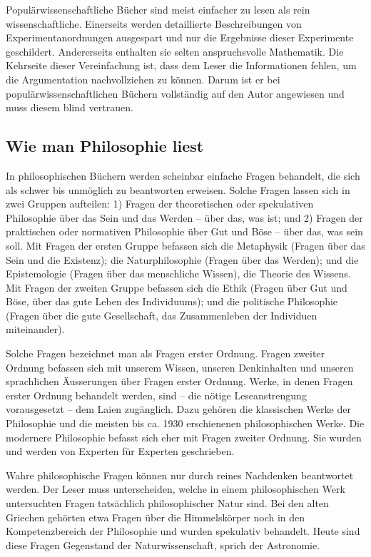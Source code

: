 \documentclass[a4paper,11pt]{scrartcl}
\begin{document}
Populärwissenschaftliche Bücher sind meist einfacher zu lesen als rein wissenschaftliche. Einerseits werden detaillierte Beschreibungen von Experimentanordnungen ausgespart und nur die Ergebnisse dieser Experimente geschildert. Andererseits enthalten sie selten anspruchsvolle Mathematik. Die Kehrseite dieser Vereinfachung ist, dass dem Leser die Informationen fehlen, um die Argumentation nachvollziehen zu können. Darum ist er bei populärwissenschaftlichen Büchern vollständig auf den Autor angewiesen und muss diesem blind vertrauen.

\subsection{Wie man Philosophie liest}

In philosophischen Büchern werden scheinbar einfache Fragen behandelt, die sich als schwer bis unmöglich zu beantworten erweisen. Solche Fragen lassen sich in zwei Gruppen aufteilen: 1) Fragen der theoretischen oder spekulativen Philosophie über das Sein und das Werden – über das, was ist; und 2) Fragen der praktischen oder normativen Philosophie über Gut und Böse – über das, was sein soll. Mit Fragen der ersten Gruppe befassen sich die Metaphysik (Fragen über das Sein und die Existenz); die Naturphilosophie (Fragen über das Werden); und die Epistemologie (Fragen über das menschliche Wissen), die Theorie des Wissens. Mit Fragen der zweiten Gruppe befassen sich die Ethik (Fragen über Gut und Böse, über das gute Leben des Individuums); und die politische Philosophie (Fragen über die gute Gesellschaft, das Zusammenleben der Individuen miteinander).

Solche Fragen bezeichnet man als Fragen erster Ordnung. Fragen zweiter Ordnung befassen sich mit unserem Wissen, unseren Denkinhalten und unseren sprachlichen Äusserungen über Fragen erster Ordnung. Werke, in denen Fragen erster Ordnung behandelt werden, sind – die nötige Leseanstrengung vorausgesetzt – dem Laien zugänglich. Dazu gehören die klassischen Werke der Philosophie und die meisten bis ca. 1930 erschienenen philosophischen Werke. Die modernere Philosophie befasst sich eher mit Fragen zweiter Ordnung. Sie wurden und werden von Experten für Experten geschrieben.

Wahre philosophische Fragen können nur durch reines Nachdenken beantwortet werden. Der Leser muss unterscheiden, welche in einem philosophischen Werk untersuchten Fragen tatsächlich philosophischer Natur sind. Bei den alten Griechen gehörten etwa Fragen über die Himmelskörper noch in den Kompetenzbereich der Philosophie und wurden spekulativ behandelt. Heute sind diese Fragen Gegenstand der Naturwissenschaft, sprich der Astronomie.
\end{document}
